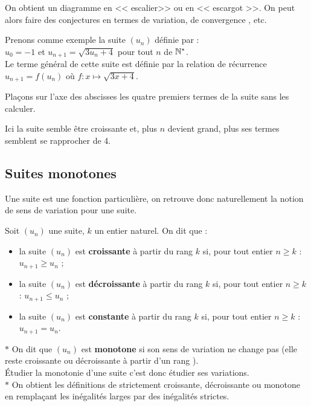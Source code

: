 On obtient  un diagramme en  << escalier>> ou en << escargot >>. On peut alors faire des conjectures en termes de variation, de convergence , etc.
 \begin{example} 
 Prenons comme exemple la suite $(u_{n})$ définie par : \\               $u_{0} = −1$ et  $u_{n+1} = \sqrt{3u_{n}+4 }$ \quad pour tout $ n$ de $ \mathbb{N}^*$. \\                    Le terme général de cette suite est définie par la relation de récurrence $ u_{n+1} =  f(u_{n} )$ où $ f : x \mapsto \sqrt{3x+4}  $. 

Plaçons sur l'axe des abscisses les quatre premiers termes de la suite sans les calculer.

Ici la suite semble être croissante et, plus $ n$ devient grand, plus ses termes semblent se rapprocher de 4.
\end{example}

\subsection*{Suites monotones}
Une suite est une fonction particulière, on retrouve donc naturellement la notion de sens de variation pour une suite.

\begin{definition} Soit $(u_{n})$ une suite, $ k $ un entier naturel. On dit que :
\begin{itemize}
\item[\textbullet] la suite $(u_{n})$   est  \textbf{\color{magenta} croissante}  à partir du rang $ k $ si, pour tout entier  $ n \geq k $ : $  u_{n+1}\geq u_{n} $ ;
\item[\textbullet]la suite $(u_{n})$   est   \textbf{\color{magenta} décroissante} à partir du rang $ k $ si, pour tout entier  $ n \geq  k $ : $ u_{n+1}\leq u_{n}$ ;
\item[\textbullet]la suite $(u_{n})$  est   \textbf{\color{magenta}constante} à partir du rang $ k $  si, pour tout entier $ n\geq k $ : $ u_{n+1}= u_{n}$.
\end{itemize}
\end{definition}

\begin{remark}
$ \ast $ On dit que $(u_{n})$ est  \textbf{monotone}  si son sens
de variation ne change pas (elle reste croissante  ou décroissante  à partir d'un rang ).\\
Étudier la monotonie d'une suite c'est donc étudier ses variations.\\
 $ \ast$ On obtient les définitions de strictement croissante, décroissante ou monotone en remplaçant les inégalités larges par des inégalités strictes.
\end{remark}

